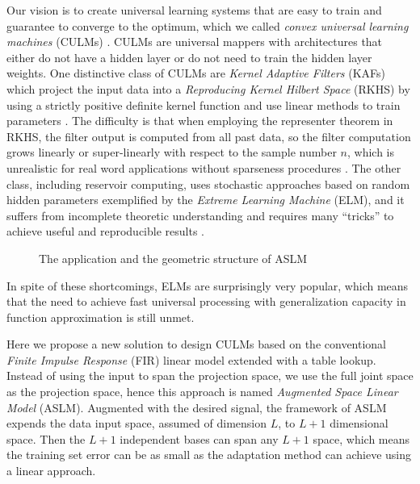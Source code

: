 \documentclass{article}
\begin{document}
Our vision is to create universal learning systems that are easy to train and guarantee to converge to the optimum, which we called \textit{convex universal learning machines} (CULMs) \cite{principe2015universal}. CULMs are universal mappers with architectures that either do not have a hidden layer or do not need to train the hidden layer weights. One distinctive class of CULMs are \textit{Kernel Adaptive Filters} (KAFs) which project the input data into a \textit{Reproducing Kernel Hilbert Space} (RKHS) by using a strictly positive definite kernel function and use linear methods to train parameters \cite{liu2011kernel}. The difficulty is that when employing the representer theorem in RKHS, the filter output is computed from all past data, so the filter computation grows linearly or super-linearly with respect to the sample number $ n $, which is unrealistic for real word applications without sparseness procedures \cite{Liu2008}. The other class, including reservoir computing, uses stochastic approaches based on random hidden parameters exemplified by the \textit{Extreme Learning Machine} (ELM), and it suffers from incomplete theoretic understanding and requires many “tricks” to achieve useful and reproducible results \cite{huang2006extreme}. 
\begin{figure*}[htbp]
	\vspace{-3mm}
	\caption{The application and the geometric structure of ASLM}\label{JS}
	\vspace{-3mm}
\end{figure*}
In spite of these shortcomings, ELMs are surprisingly very popular, which means that the need to achieve fast universal processing with generalization capacity in function approximation is still unmet. 

Here we propose a new solution to design CULMs based on the conventional \textit{Finite Impulse Response} (FIR) linear model extended with a table lookup. Instead of using the input to span the projection space, we use the full joint space as the projection space, hence this approach is named \textit{Augmented Space Linear Model} (ASLM). Augmented with the desired signal, the framework of ASLM expends the data input space, assumed of dimension $ L $, to $ L+1 $ dimensional space. Then the $ L+1 $ independent bases can span any $ L+1 $ space, which means the training set error can be as small as the adaptation method can achieve using a linear approach.
\end{document}
